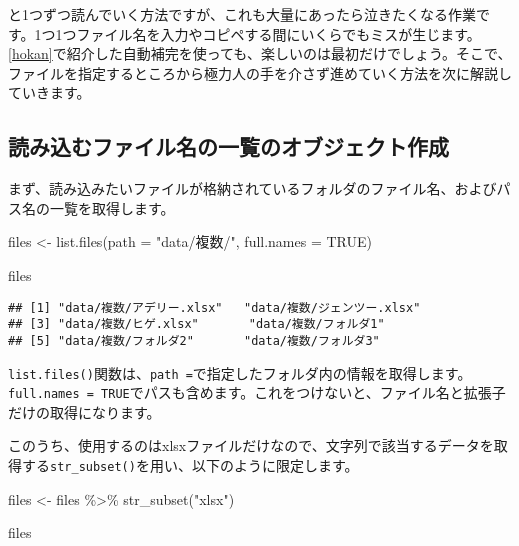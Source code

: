 \documentclass[
  xelatex,ja=standard, b5paper]{bxjsbook}
\newenvironment{Shaded}{\begin{snugshade}}{\end{snugshade}}
\newcommand{\AttributeTok}[1]{\textcolor[rgb]{0.77,0.63,0.00}{#1}}
\newcommand{\ConstantTok}[1]{\textcolor[rgb]{0.00,0.00,0.00}{#1}}
\newcommand{\FunctionTok}[1]{\textcolor[rgb]{0.00,0.00,0.00}{#1}}
\newcommand{\NormalTok}[1]{#1}
\newcommand{\OtherTok}[1]{\textcolor[rgb]{0.56,0.35,0.01}{#1}}
\newcommand{\SpecialCharTok}[1]{\textcolor[rgb]{0.00,0.00,0.00}{#1}}
\newcommand{\StringTok}[1]{\textcolor[rgb]{0.31,0.60,0.02}{#1}}
\begin{document}
と1つずつ読んでいく方法ですが、これも大量にあったら泣きたくなる作業です。1つ1つファイル名を入力やコピペする間にいくらでもミスが生じます。\ref{hokan}で紹介した自動補完を使っても、楽しいのは最初だけでしょう。そこで、ファイルを指定するところから極力人の手を介さず進めていく方法を次に解説していきます。

\hypertarget{ux8aadux307fux8fbcux3080ux30d5ux30a1ux30a4ux30ebux540dux306eux4e00ux89a7ux306eux30aaux30d6ux30b8ux30a7ux30afux30c8ux4f5cux6210}{%
\subsection{読み込むファイル名の一覧のオブジェクト作成}\label{ux8aadux307fux8fbcux3080ux30d5ux30a1ux30a4ux30ebux540dux306eux4e00ux89a7ux306eux30aaux30d6ux30b8ux30a7ux30afux30c8ux4f5cux6210}}

まず、読み込みたいファイルが格納されているフォルダのファイル名、およびパス名の一覧を取得します。

\begin{Shaded}
\begin{Highlighting}[]
\NormalTok{files }\OtherTok{\textless{}{-}}
    \FunctionTok{list.files}\NormalTok{(}\AttributeTok{path =} \StringTok{"data/複数/"}\NormalTok{, }\AttributeTok{full.names =} \ConstantTok{TRUE}\NormalTok{)}

\NormalTok{files}
\end{Highlighting}
\end{Shaded}

\begin{verbatim}
## [1] "data/複数/アデリー.xlsx"   "data/複数/ジェンツー.xlsx"
## [3] "data/複数/ヒゲ.xlsx"       "data/複数/フォルダ1"      
## [5] "data/複数/フォルダ2"       "data/複数/フォルダ3"
\end{verbatim}

\texttt{list.files()}関数は、\texttt{path\ =}で指定したフォルダ内の情報を取得します。\texttt{full.names\ =\ TRUE}でパスも含めます。これをつけないと、ファイル名と拡張子だけの取得になります。

このうち、使用するのはxlsxファイルだけなので、文字列で該当するデータを取得する\texttt{str\_subset()}を用い、以下のように限定します。

\begin{Shaded}
\begin{Highlighting}[]
\NormalTok{files }\OtherTok{\textless{}{-}} 
\NormalTok{  files }\SpecialCharTok{\%\textgreater{}\%} \FunctionTok{str\_subset}\NormalTok{(}\StringTok{"xlsx"}\NormalTok{)}

\NormalTok{files}
\end{Highlighting}
\end{Shaded}
\end{document}
